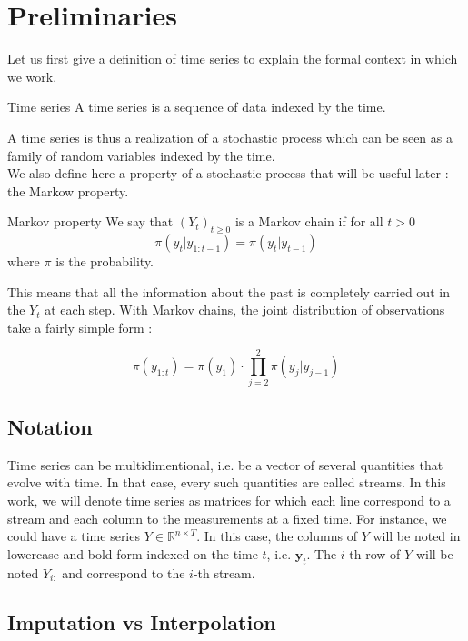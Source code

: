 \documentclass{article}
\begin{document}
\section{Preliminaries}
\label{prem}
Let us first give a definition of time series to explain the formal context in which we work. \\

\theoremstyle{definition}
\begin{definition}{Time series}
A time series is a sequence of data indexed by the time.
\end{definition}

A time series is thus a realization of a stochastic process which can be seen as a family of random variables indexed by the time. \\

We also define here a property of a stochastic process that will be useful later : the Markow property. \\

\theoremstyle{definition}
\begin{definition}{Markov property}
We say that $(Y_t)_{t \ge 0}$ is a Markov chain if for all $t > 0$
$$\pi(y_t|y_{1:t-1}) = \pi(y_t|y_{t-1})$$
where $\pi$ is the probability.
\end{definition}

This means that all the information about the past is completely carried out in the $Y_t$ at each step. With Markov chains, the joint distribution of observations take a fairly simple form :

$$\pi(y_{1:t}) = \pi(y_1) \cdot \prod_{j=2}^2 \pi(y_j|y_{j-1})$$

\subsection*{Notation}

Time series can be multidimentional, i.e. be a vector of several quantities that evolve with time. In that case, every such quantities are called streams. In this work, we will denote time series as matrices for which each line correspond to a stream and each column to the measurements at a fixed time. For instance, we could have a time series $Y \in \mathbb{R}^{n \times T}$. In this case, the columns of $Y$ will be noted in lowercase and bold form indexed on the time $t$, i.e. $\mathbf{y}_t$. The $i$-th row of $Y$ will be noted $Y_{i:}$ and correspond to the $i$-th stream.

\subsection*{Imputation vs Interpolation}
\end{document}
